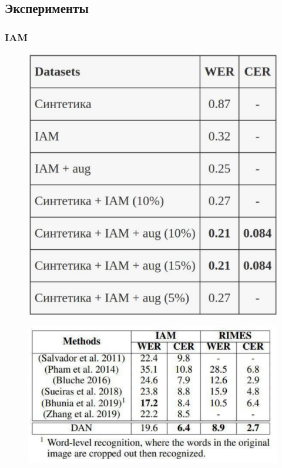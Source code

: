 \documentclass[12pt]{article}
\begin{document}
\subsection{Эксперименты}

\subsubsection{IAM}



\begin{figure}[htb]
    \centering
    \begin{minipage}{.45\textwidth}
        \centering
        \includegraphics[width=0.65\linewidth]{IAM_compare.png}
        \label{table:compare_iam}
    \end{minipage}%
    \begin{minipage}{.55\textwidth}
        \centering
        \includegraphics[width=\linewidth]{iam_compare_dan.png}
        \label{table:compare_iam_dan}
    \end{minipage}
\end{figure}
\end{document}
